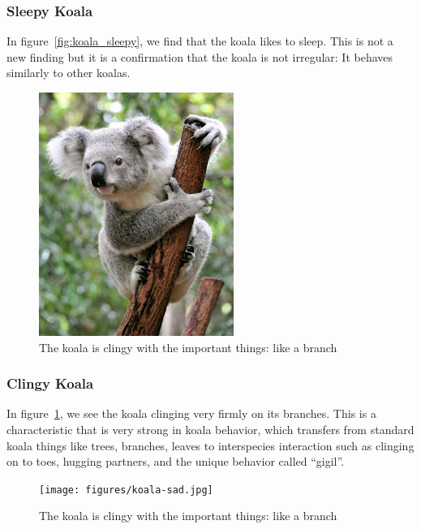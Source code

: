 \documentclass[conference]{IEEEtran}
\begin{document}
\subsubsection{Sleepy Koala}
In figure~\ref{fig:koala_sleepy}, we find that the koala likes to sleep. This is not a new finding but it is a confirmation that the koala is not irregular: It behaves similarly to other koalas.


\begin{figure}[]
\centering
\includegraphics[width=2.5in]{figures/koala-clingy.jpg}
\caption{The koala is clingy with the important things: like a branch}
\label{fig:koala_clingy}
\end{figure}

\subsubsection{Clingy Koala}
In figure~\ref{fig:koala_clingy}, we see the koala clinging very firmly on its branches. This is a characteristic that is very strong in koala behavior, which transfers from standard koala things like trees, branches, leaves to interspecies interaction such as clinging on to toes, hugging partners, and the unique behavior called ``gigil''.


\begin{figure}[]
\centering
\texttt{[image: figures/koala-sad.jpg]}
\caption{The koala is clingy with the important things: like a branch}
\label{fig:koala_sad}
\end{figure}
\end{document}
